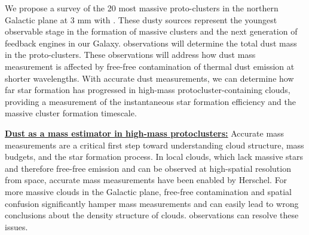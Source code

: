 
We propose a survey of the 20 most massive proto-clusters in the northern
Galactic plane at 3 mm with \MUSTANG.  These dusty sources represent the
youngest observable stage in the formation of massive clusters and the next
generation of feedback engines in our Galaxy.  \MUSTANG observations will
determine the total dust mass in the proto-clusters.   These observations will
address how dust mass measurement is affected by free-free contamination of
thermal dust emission at shorter wavelengths.  With accurate dust measurements,
we can determine how far star formation has progressed in high-mass
protocluster-containing clouds, providing a measurement of the instantaneous
star formation efficiency and the massive cluster formation timescale.


\indent\underline{\textbf{\helv Dust as a mass estimator in high-mass protoclusters:}} 
Accurate mass measurements are a critical first step toward understanding cloud
structure, mass budgets, and the star formation process.  In local clouds,
which lack massive stars and therefore free-free emission and can be observed
at high-spatial resolution from space, accurate mass measurements have been
enabled by Herschel.  For more massive clouds in the Galactic plane, free-free
contamination and spatial confusion significantly hamper mass measurements and
can easily lead to wrong conclusions about the density structure of clouds.
\MUSTANG observations can resolve these issues.

